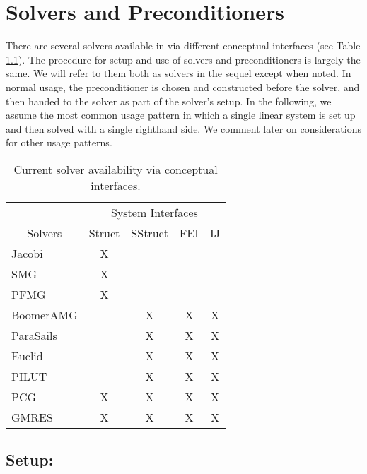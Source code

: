 
\chapter{Solvers and Preconditioners}
\label{ch-Solvers}

There are several solvers available in \hypre{} via different
conceptual interfaces (see Table \ref{table-solver-availability}).
The procedure for setup and use of solvers and preconditioners is
largely the same. We will refer to them both as solvers in the sequel
except when noted.  In normal usage, the preconditioner is chosen and
constructed before the solver, and then handed to the solver as part
of the solver's setup.  In the following, we assume the most common
usage pattern in which a single linear system is set up and then
solved with a single righthand side. We comment later on
considerations for other usage patterns.

\begin{table}[h]
\center
\begin{tabular}{|l||c|c|c|c|}
\hline
                               & \multicolumn{4}{|c|}{System Interfaces} \\
\multicolumn{1}{|c||}{Solvers} & Struct & SStruct & FEI & IJ \\
\hline\hline
Jacobi     & X &   &   &   \\
SMG        & X &   &   &   \\
PFMG       & X &   &   &   \\
BoomerAMG  &   & X & X & X \\
ParaSails  &   & X & X & X \\
Euclid     &   & X & X & X \\
PILUT      &   & X & X & X \\
PCG        & X & X & X & X \\
GMRES      & X & X & X & X \\
\hline
\end{tabular}
\caption{%
Current solver availability via \hypre{} conceptual interfaces.
}
\label{table-solver-availability}
\end{table}


\section*{Setup:}

